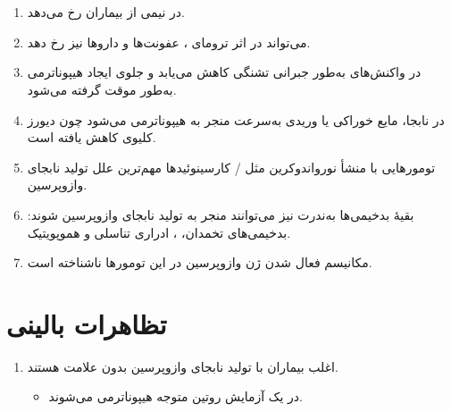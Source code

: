 \documentclass[a4paper,12pt]{article}
\begin{document}
\section*{}
\begin{enumerate}[label=\arabic*.,start=1]
\item {} در نیمی از بیماران  رخ می‌دهد.
\item {} می‌تواند در اثر ترومای ، عفونت‌ها و داروها نیز رخ دهد.
\item در واکنش‌های  به‌طور جبرانی تشنگی کاهش می‌یابد و جلوی ایجاد هیپوناترمی به‌طور موقت گرفته می‌شود.
\item در  نابجا، مایع خوراکی یا وریدی به‌سرعت منجر به هیپوناترمی می‌شود چون دیورز کلیوی کاهش یافته است.
\item تومورهایی با منشأ نورواندوکرین مثل  / کارسینوئیدها مهم‌ترین علل تولید نابجای وازوپرسین.
\item بقیهٔ بدخیمی‌ها به‌ندرت نیز می‌توانند منجر به تولید نابجای وازوپرسین شوند: بدخیمی‌های تخمدان، ، ادراری تناسلی و هموپویتیک.
\item مکانیسم فعال شدن ژن وازوپرسین در این تومورها ناشناخته است.
\end{enumerate}
\section*{تظاهرات بالینی}
\begin{enumerate}[label=\arabic*.,start=8]
\item اغلب بیماران با تولید نابجای وازوپرسین بدون علامت هستند.
\begin{itemize}
\item در یک آزمایش روتین متوجه هیپوناترمی می‌شوند.
\end{itemize}
\end{enumerate}
\end{document}

